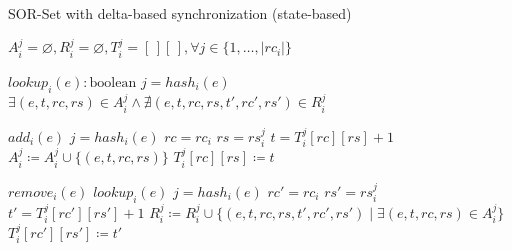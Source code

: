 \begin{algorithm}[h!]
\small{
	\caption{SOR-Set with delta-based synchronization (state-based)}
 	\label{alg:sor_set}                       

 	\begin{algorithmic}[1]
      \State \Payload $A_{i}^{j} = \varnothing, R_{i}^{j} = \varnothing, T_{i}^{j} = [\,][\,], \forall j \in \{1,\ldots,|rc_{i}|\}$
      \State \textcolor{gray}{}

 	  \State \Query $lookup_{i}(e) : \text{boolean}$
 	  \State \hspace{\algorithmicindent} \Let $j = hash_{i}(e)$
 	  \State \hspace{\algorithmicindent} \Return $\exists (e, t, rc, rs) \in A_{i}^{j} \land \nexists (e, t, rc, rs, t', rc', rs') \in R_{i}^{j}$

 	  \State \Update $add_{i}(e)$
 	  \State \hspace{\algorithmicindent} \Let $j = hash_{i}(e)$
 	  \State \hspace{\algorithmicindent} \Let $rc = rc_{i}$
 	  \State \hspace{\algorithmicindent} \Let $rs = rs_{i}^{j}$
 	  \State \hspace{\algorithmicindent} \Let $t = T_{i}^{j}[rc][rs] + 1$
 	  \State \hspace{\algorithmicindent} $A_{i}^{j} \coloneqq A_{i}^{j} \cup \{(e, t, rc, rs)\}$
 	  \State \hspace{\algorithmicindent} $T_{i}^{j}[rc][rs] \coloneqq t$

 	  \State \Update $remove_{i}(e)$
 	  \State \hspace{\algorithmicindent} \Pre $lookup_{i}(e)$
 	  \State \hspace{\algorithmicindent} \Let $j = hash_{i}(e)$
 	  \State \hspace{\algorithmicindent} \Let $rc' = rc_{i}$
 	  \State \hspace{\algorithmicindent} \Let $rs' = rs_{i}^{j}$
 	  \State \hspace{\algorithmicindent} \Let $t' = T_{i}^{j}[rc'][rs'] + 1$
 	  \State \hspace{\algorithmicindent} $R_{i}^{j} \coloneqq R_{i}^{j} \cup \{(e, t, rc, rs, t', rc', rs') \mid \exists (e, t, rc, rs) \in A_{i}^{j}\}$
 	  \State \hspace{\algorithmicindent} $T_{i}^{j}[rc'][rs'] \coloneqq t'$
 	  

\end{algorithmic}}
\end{algorithm}
